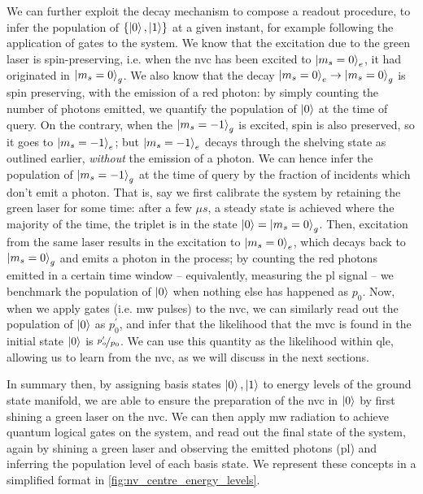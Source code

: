 We can further exploit the decay mechanism to compose a readout procedure, 
    to infer the population of $\{\ket{0}, \ket{1}\}$ at a given instant, 
    for example following the application of gates to the system. 
We know that the excitation due to the green laser is spin-preserving, 
    i.e. when the \gls{nvc} has been excited to $\ket{m_s=0}_e$, 
    it had originated in $\ket{m_s=0}_g$.
We also know that the decay $\ket{m_s=0}_e \rightarrow \ket{m_s=0}_g$ is spin preserving, with the emission of 
    a red photon: by simply counting the number of photons emitted, we quantify the population of $\ket{0}$
    at the time of query. 
On the contrary, when the $\ket{m_s=-1}_g$ is excited, spin is also preserved, 
    so it goes to $\ket{m_s=-1}_e$;
    but $\ket{m_s=-1}_e$ decays 
    through the shelving state as outlined earlier, 
    \emph{without} the emission of a photon. 
We can hence infer the population of $\ket{m_s=-1}_g$ at the time of query by the fraction of incidents which don't emit a photon.
That is, say we first calibrate the system by retaining the green laser for some time: 
    after a few $\mu s$, a steady state is achieved where the majority of the time, the triplet is in the state $\ket{0} = \ket{m_s=0}_g$. 
Then, excitation from the same laser results in the excitation to $\ket{m_s=0}_e$, 
    which decays back to $\ket{m_s=0}_g$ and emits a photon in the process; 
    by counting the red photons emitted in a certain time window -- equivalently, measuring the \gls{pl} signal -- 
    we benchmark the population of $\ket{0}$ when nothing else has happened as $p_0$. 
Now, when we apply gates (i.e. \gls{mw} pulses) to the \gls{nvc}, 
    we can similarly read out the population of $\ket{0}$ as $p_0^{\prime}$,
    and infer that the likelihood that the \gls{mvc} is found in the initial state $\ket{0}$ is $\nicefrac{p_o^{\prime}}{p_0}$. 
We can use this quantity as the \gls{likelihood} within \gls{qle}, allowing us to learn from the \gls{nvc},
    as we will discuss in the next sections. 
\par 

In summary then, by assigning basis states $\ket{0}, \ket{1}$ to energy levels of the ground state manifold, 
    we are able to ensure the preparation of the \gls{nvc} in $\ket{0}$ by first shining a green laser on the \gls{nvc}. 
We can then apply \gls{mw} radiation to achieve quantum logical gates on the system, 
    and read out the final state of the system, again by shining a green laser
    and observing the emitted photons (\gls{pl}) and inferring the population level of each basis state. 
We represent these concepts in a simplified format in \cref{fig:nv_centre_energy_levels}. 


